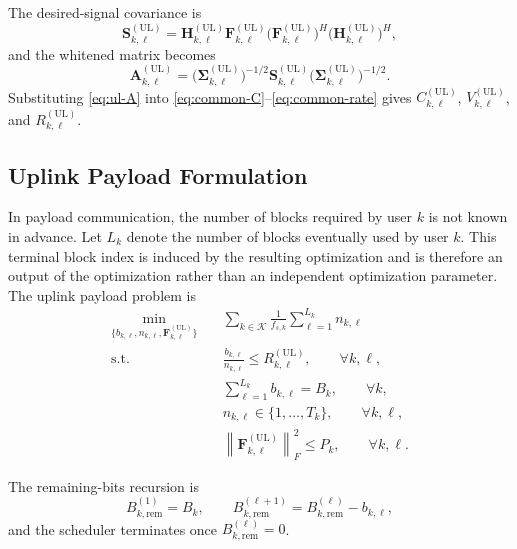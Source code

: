 \documentclass[11pt]{article}
\newcommand{\Kset}{\mathcal{K}}
\newcommand{\Hc}{\mathbf{H}}
\newcommand{\F}{\mathbf{F}}
\newcommand{\A}{\mathbf{A}}
\newcommand{\Sig}{\mathbf{\Sigma}}
\newcommand{\Smat}{\mathbf{S}}
\newcommand{\norm}[1]{\left\lVert #1 \right\rVert}
\newcommand{\UL}{\mathrm{UL}}
\begin{document}
The desired-signal covariance is
\begin{equation}
\Smat_{k,\ell}^{(\UL)}
=
\Hc_{k,\ell}^{(\UL)}
\F_{k,\ell}^{(\UL)}
\bigl(\F_{k,\ell}^{(\UL)}\bigr)^H
\bigl(\Hc_{k,\ell}^{(\UL)}\bigr)^H,
\label{eq:ul-signal-cov}
\end{equation}
and the whitened matrix becomes
\begin{equation}
\A_{k,\ell}^{(\UL)}
=
\bigl(\Sig_{k,\ell}^{(\UL)}\bigr)^{-1/2}
\Smat_{k,\ell}^{(\UL)}
\bigl(\Sig_{k,\ell}^{(\UL)}\bigr)^{-1/2}.
\label{eq:ul-A}
\end{equation}
Substituting \eqref{eq:ul-A} into
\eqref{eq:common-C}--\eqref{eq:common-rate} gives
$C_{k,\ell}^{(\UL)}$, $V_{k,\ell}^{(\UL)}$, and
$R_{k,\ell}^{(\UL)}$.

\subsection{Uplink Payload Formulation}

In payload communication, the number of blocks required by user $k$ is not
known in advance. Let $L_k$ denote the number of blocks eventually used by user
$k$. This terminal block index is induced by the resulting optimization and is
therefore an output of the optimization rather than an independent optimization
parameter. The uplink payload problem is
\begin{subequations}
\begin{align}
\min_{\{b_{k,\ell},n_{k,\ell},\F_{k,\ell}^{(\UL)}\}}
\quad
&
\sum_{k\in\Kset}\frac{1}{f_{s,k}}\sum_{\ell=1}^{L_k} n_{k,\ell}
\label{eq:ul-payload-obj}
\\
\text{s.t.}\quad
&
\frac{b_{k,\ell}}{n_{k,\ell}}
\le
R_{k,\ell}^{(\UL)},
\qquad \forall k,\ell,
\label{eq:ul-payload-fbl}
\\
&
\sum_{\ell=1}^{L_k} b_{k,\ell} = B_k,
\qquad \forall k,
\label{eq:ul-payload-conservation}
\\
&
n_{k,\ell} \in \{1,\dots,T_k\},
\qquad \forall k,\ell,
\label{eq:ul-payload-n}
\\
&
\norm{\F_{k,\ell}^{(\UL)}}_F^2 \le P_k,
\qquad \forall k,\ell.
\label{eq:ul-payload-power}
\end{align}
\end{subequations}

The remaining-bits recursion is
\begin{equation}
B_{k,\mathrm{rem}}^{(1)}=B_k,
\qquad
B_{k,\mathrm{rem}}^{(\ell+1)}=B_{k,\mathrm{rem}}^{(\ell)}-b_{k,\ell},
\label{eq:ul-remaining-recursion}
\end{equation}
and the scheduler terminates once $B_{k,\mathrm{rem}}^{(\ell)}=0$.
\end{document}
